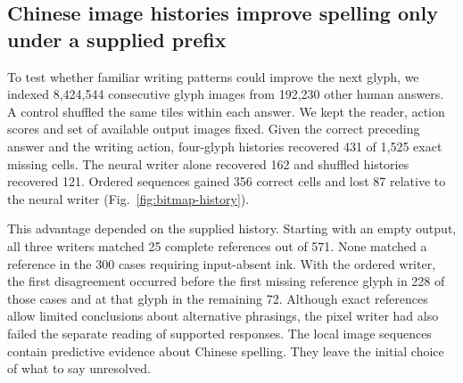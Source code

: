 \subsection*{Chinese image histories improve spelling only under a supplied prefix}
To test whether familiar writing patterns could improve the next glyph, we indexed 8,424,544 consecutive glyph images from 192,230 other human answers. A control shuffled the same tiles within each answer. We kept the reader, action scores and set of available output images fixed. Given the correct preceding answer and the writing action, four-glyph histories recovered 431 of 1,525 exact missing cells. The neural writer alone recovered 162 and shuffled histories recovered 121. Ordered sequences gained 356 correct cells and lost 87 relative to the neural writer (Fig.~\ref{fig:bitmap-history}).

This advantage depended on the supplied history. Starting with an empty output, all three writers matched 25 complete references out of 571. None matched a reference in the 300 cases requiring input-absent ink. With the ordered writer, the first disagreement occurred before the first missing reference glyph in 228 of those cases and at that glyph in the remaining 72. Although exact references allow limited conclusions about alternative phrasings, the pixel writer had also failed the separate reading of supported responses. The local image sequences contain predictive evidence about Chinese spelling. They leave the initial choice of what to say unresolved.
